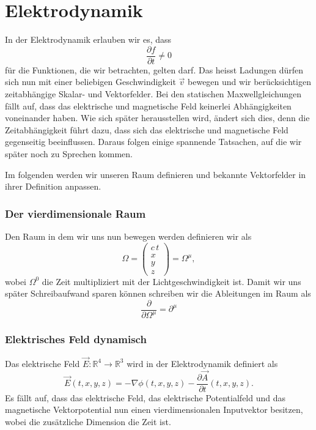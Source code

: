 %
%
%
%
\section{Elektrodynamik\label{section:maxwell:elektrodynmaik}}
In der Elektrodynamik erlauben wir es, dass
\[
\frac{\partial f}{\partial t}
\neq
0
\]
für die Funktionen, die wir betrachten, gelten darf.
Das heisst Ladungen dürfen sich nun mit einer beliebigen Geschwindigkeit $\vec{v}$ bewegen und wir berücksichtigen zeitabhängige Skalar- und Vektorfelder.
Bei den statischen Maxwellgleichungen fällt auf, dass das elektrische und magnetische Feld keinerlei Abhängigkeiten voneinander haben.
Wie sich später herausstellen wird, ändert sich dies, denn die Zeitabhängigkeit führt dazu, dass sich das elektrische und magnetische Feld gegenseitig beeinflussen.
Daraus folgen einige spannende Tatsachen, auf die wir später noch zu Sprechen kommen.
 
Im folgenden werden wir unseren Raum definieren und bekannte Vektorfelder in ihrer Definition anpassen.

\subsubsection{Der vierdimensionale Raum}
Den Raum in dem wir uns nun bewegen werden definieren wir als
\begin{equation}
	\Omega
	=
	\begin{pmatrix}
		c\,t\\
		x\\
		y\\
		z
	\end{pmatrix}
	=
	\Omega^{\mu},
\end{equation}
wobei $\Omega^0$ die Zeit multipliziert mit der Lichtgeschwindigkeit ist.
Damit wir uns später Schreibaufwand sparen können schreiben wir die Ableitungen im Raum als
\[
\frac{\partial}{\partial \Omega^{\mu}}
=
\partial^{\mu}
\]

\subsubsection{Elektrisches Feld dynamisch}
Das elektrische Feld
\(
\vec{E}: \mathbb{R}^4 \rightarrow \mathbb{R}^3
\)
wird in der Elektrodynamik definiert als
\begin{equation}
	\vec{E}(t,x,y,z)
	=
	- \nabla\phi(t,x,y,z) - \frac{\partial \vec{A}}{\partial t}(t,x,y,z).
	\label{maxwell:section:definiton_dynamisch_elektrischesFeld}
\end{equation}
Es fällt auf, dass das elektrische Feld, das elektrische Potentialfeld und das magnetische Vektorpotential nun einen vierdimensionalen Inputvektor besitzen, wobei die zusätzliche Dimension die Zeit ist. 

